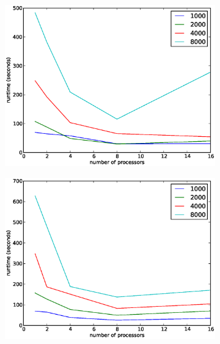 \documentclass[12pt]{article}
\begin{document}
\begin{figure}[H]
	\begin{subfigure}{0.5\textwidth}
    \includegraphics[width=\textwidth]{scalingtiger_rs_000}
	\caption{}
	\end{subfigure}
	\begin{subfigure}{0.5\textwidth}
	\includegraphics[width=\textwidth]{scalingtiger_rs_050}
	\caption{}
	\end{subfigure}
	\begin{subfigure}{0.5\textwidth}

\end{subfigure}
\end{figure}
\end{document}
